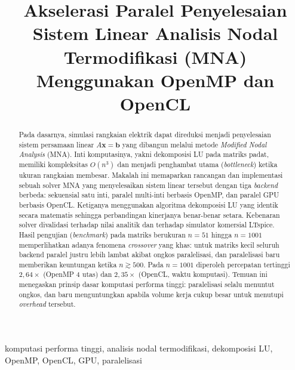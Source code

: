 \documentclass[conference]{IEEEtran}
\begin{document}
\title{Akselerasi Paralel Penyelesaian Sistem Linear Analisis Nodal Termodifikasi (MNA) Menggunakan OpenMP dan OpenCL}

\author{
}

\maketitle

\begin{abstract}
Pada dasarnya, simulasi rangkaian elektrik dapat direduksi menjadi penyelesaian sistem persamaan linear $A\mathbf{x}=\mathbf{b}$ yang dibangun melalui metode \emph{Modified Nodal Analysis} (MNA). Inti komputasinya, yakni dekomposisi LU pada matriks padat, memiliki kompleksitas $O(n^3)$ dan menjadi penghambat utama (\emph{bottleneck}) ketika ukuran rangkaian membesar. Makalah ini memaparkan rancangan dan implementasi sebuah solver MNA yang menyelesaikan sistem linear tersebut dengan tiga \emph{backend} berbeda: sekuensial satu inti, paralel multi-inti berbasis OpenMP, dan paralel GPU berbasis OpenCL. Ketiganya menggunakan algoritma dekomposisi LU yang identik secara matematis sehingga perbandingan kinerjanya benar-benar setara. Kebenaran solver divalidasi terhadap nilai analitik dan terhadap simulator komersial LTspice. Hasil pengujian (\emph{benchmark}) pada matriks berukuran $n=51$ hingga $n=1001$ memperlihatkan adanya fenomena \emph{crossover} yang khas: untuk matriks kecil seluruh backend paralel justru lebih lambat akibat ongkos paralelisasi, dan paralelisasi baru memberikan keuntungan ketika $n \gtrsim 500$. Pada $n=1001$ diperoleh percepatan tertinggi $2{,}64\times$ (OpenMP 4 utas) dan $2{,}35\times$ (OpenCL, waktu komputasi). Temuan ini menegaskan prinsip dasar komputasi performa tinggi: paralelisasi selalu menuntut ongkos, dan baru menguntungkan apabila volume kerja cukup besar untuk menutupi \emph{overhead} tersebut.
\end{abstract}

\begin{IEEEkeywords}
komputasi performa tinggi, analisis nodal termodifikasi, dekomposisi LU, OpenMP, OpenCL, GPU, paralelisasi
\end{IEEEkeywords}
\end{document}
